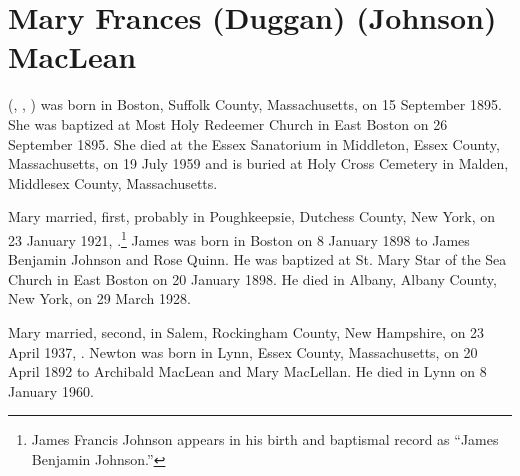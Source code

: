 \section{Mary Frances (Duggan) (Johnson) MacLean}\label{per:Mary4Duggan}

 (, , ) was born in Boston, Suffolk County, Massachusetts, on 15 September 1895.\cite{Mary4DugganBirth} She was baptized at Most Holy Redeemer Church in East Boston on 26 September 1895.\cite{Mary4DugganBaptism} She died at the Essex Sanatorium in Middleton, Essex County, Massachusetts, on 19 July 1959 and is buried at Holy Cross Cemetery in Malden, Middlesex County, Massachusetts.\cite{Mary4DugganDeath} 

Mary married, first, probably in Poughkeepsie, Dutchess County, New York, on 23 January 1921, .\footnote{James Francis Johnson appears in his birth and baptismal record as ``James Benjamin Johnson.''}\cite{JamesJohnsonMarriage} James was born in Boston on 8 January 1898 to James Benjamin Johnson and Rose Quinn.\cite{JamesJohnsonBirth} He was baptized at St. Mary Star of the Sea Church in East Boston on 20 January 1898.\cite{JamesJohnsonBaptism} He died in Albany, Albany County, New York, on 29 March 1928.\cite{JamesJohnsonDeath}

Mary married, second, in Salem, Rockingham County, New Hampshire, on 23 April 1937, .\cite{NewtonMacLeanMarriage} Newton was born in Lynn, Essex County, Massachusetts, on 20 April 1892 to Archibald MacLean and Mary MacLellan.\cite{NewtonMacLeanBirth} He died in Lynn on 8 January 1960.\cite{NewtonMacLeanDeath}

